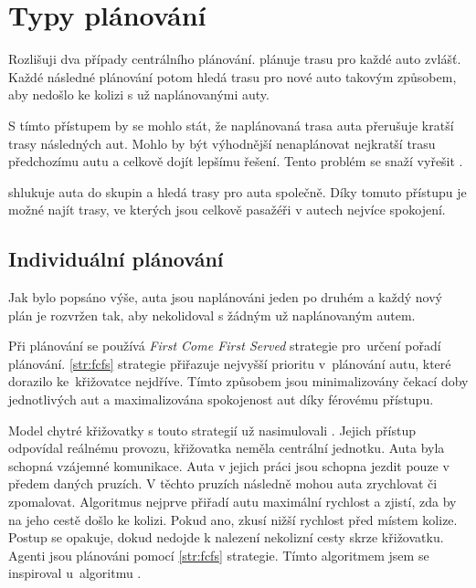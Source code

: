 \section{Typy plánování}\label{sec:typy_planovani}


Rozlišuji dva případy centrálního plánování.
\textrm{} plánuje trasu pro každé auto zvlášť.
Každé následné plánování potom hledá trasu pro nové auto takovým způsobem, aby nedošlo ke kolizi s už naplánovanými auty.

S tímto přístupem by se mohlo stát, že naplánovaná trasa auta přerušuje kratší trasy následných aut.
Mohlo by být výhodnější nenaplánovat nejkratší trasu předchozímu autu a celkově dojít lepšímu řešení.
Tento problém se snaží vyřešit .

\textrm{} shlukuje auta do skupin a hledá trasy pro auta společně.
Díky tomuto přístupu je možné najít trasy, ve kterých jsou celkově pasažéři v autech nejvíce spokojení.

\subsection{Individuální plánování}\label{subsec:individualni_planovani}

%
%




Jak bylo popsáno výše, auta jsou naplánováni jeden po druhém a
každý nový plán je rozvržen tak, aby nekolidoval s žádným už naplánovaným autem.

Při plánování se používá \emph{First Come First Served}  strategie pro~určení pořadí plánování.
\ref{str:fcfs} strategie přiřazuje nejvyšší prioritu v~plánování autu, které dorazilo ke~křižovatce nejdříve.
Tímto způsobem jsou minimalizovány čekací doby jednotlivých aut a maximalizována spokojenost aut díky férovému přístupu.

Model chytré křižovatky s touto strategií už nasimulovali \citet*{Dresner}.
Jejich přístup odpovídal reálnému provozu, křižovatka neměla centrální jednotku.
Auta byla schopná vzájemné komunikace.
Auta v jejich práci jsou schopna jezdit pouze v předem daných pruzích.
V těchto pruzích následně mohou auta zrychlovat či zpomalovat.
Algoritmus nejprve přiřadí autu maximální rychlost a zjistí, zda by na jeho cestě došlo ke kolizi.
Pokud ano, zkusí nižší rychlost před místem kolize.
Postup se opakuje, dokud nedojde k nalezení nekolizní cesty skrze křižovatku.
Agenti jsou plánováni pomocí \ref{str:fcfs} strategie.
Tímto algoritmem jsem se inspiroval u~algoritmu .

